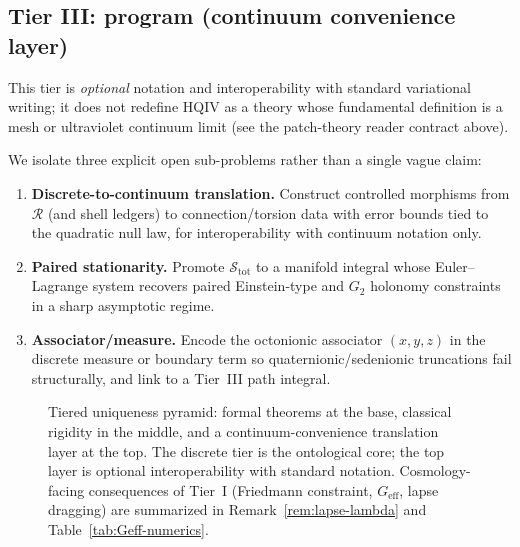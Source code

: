 \documentclass[11pt]{amsart}
\begin{document}
\subsection{Tier III: program (continuum convenience layer)}

This tier is \emph{optional} notation and interoperability with standard variational writing; it does not redefine HQIV as a theory whose fundamental definition is a mesh or ultraviolet continuum limit (see the patch-theory reader contract above).

We isolate three explicit open sub-problems rather than a single vague claim:
\begin{enumerate}
\item \textbf{Discrete-to-continuum translation.} Construct controlled morphisms from \(\mathcal{R}\) (and shell ledgers) to connection/torsion data with error bounds tied to the quadratic null law, for interoperability with continuum notation only.
\item \textbf{Paired stationarity.} Promote \(\mathcal{S}_{\mathrm{tot}}\) to a manifold integral whose Euler--Lagrange system recovers paired Einstein-type and \(G_2\) holonomy constraints in a sharp asymptotic regime.
\item \textbf{Associator/measure.} Encode the octonionic associator \((x,y,z)\) in the discrete measure or boundary term so quaternionic/sedenionic truncations fail structurally, and link to a Tier~III path integral.
\end{enumerate}

\begin{figure}[ht]
\centering
{}
\caption{Tiered uniqueness pyramid: formal theorems at the base, classical rigidity in the middle, and a continuum-convenience translation layer at the top. The discrete tier is the ontological core; the top layer is optional interoperability with standard notation. Cosmology-facing consequences of Tier~I (Friedmann constraint, \(G_{\mathrm{eff}}\), lapse dragging) are summarized in Remark~\ref{rem:lapse-lambda} and Table~\ref{tab:Geff-numerics}.}
\label{fig:pyramid}
\end{figure}
\end{document}
